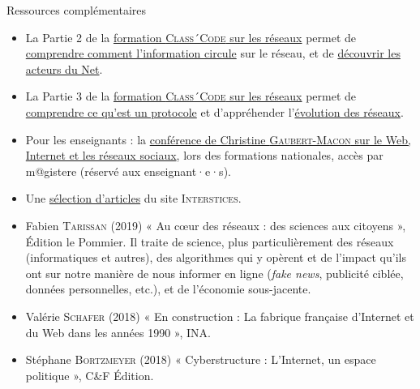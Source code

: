 \begin{gofurther}{Ressources complémentaires}
\begin{itemize}\jazzitem
\item La Partie 2 de la \href{https://pixees.fr/classcode/formations/module4/\#partie2}{formation \textsc{Class´Code} sur les réseaux} permet de \href{https://openclassrooms.com/fr/courses/4297411-connecter-le-reseau/4304576-decouvrez-comment-l-information-circule-sur-le-reseau}{comprendre comment l’information circule} sur le réseau, et de \href{https://openclassrooms.com/fr/courses/4297411-connecter-le-reseau/4304581-partez-a-la-decouverte-des-acteurs-du-net}{découvrir les acteurs du Net}.
\item La Partie 3 de la \href{https://pixees.fr/classcode/formations/module4/\#partie3}{formation \textsc{Class´Code} sur les réseaux} permet de \href{https://openclassrooms.com/fr/courses/4297411-connecter-le-reseau/4304631-mais-qu-est-ce-qu-un-protocole}{comprendre ce qu'est un protocole} et d'appréhender l'\href{https://openclassrooms.com/fr/courses/4297411-connecter-le-reseau}{évolution des réseaux}.
\item Pour les enseignants : la \href{https://magistere.education.fr/dgesco/}{conférence de Christine \textsc{Gaubert-Macon} sur le Web, Internet et les réseaux sociaux}, lors des formations nationales, accès par m@gistere (réservé aux enseignant·e·s).
\item Une \href{https://interstices.info/dossier/snt-internet/}{sélection d'articles} du site \textsc{Interstices}.
\end{itemize}

\vspace{2pt}
\begin{itemize}\jazzitem
\item Fabien \textsc{Tarissan} (2019) « Au cœur des réseaux : des sciences aux citoyens », Édition le Pommier. Il traite de science, plus particulièrement des réseaux (informatiques et autres), des algorithmes qui y opèrent et de l'impact qu'ils ont sur notre manière de nous informer en ligne (\textit{fake news}, publicité ciblée, données personnelles, etc.), et de l'économie sous-jacente.
\item Valérie \textsc{Schafer} (2018) « En construction : La fabrique française d'Internet et du Web dans les années 1990 », INA.
\item Stéphane \textsc{Bortzmeyer} (2018) « Cyberstructure : L'Internet, un espace politique », C{\&}F Édition.
\end{itemize}


\end{gofurther}
